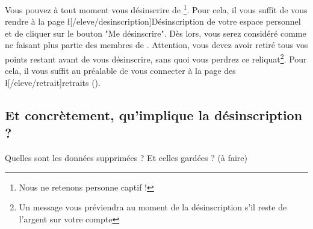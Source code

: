﻿Vous pouvez à tout moment vous désinscrire de \eDevoir\footnote{Nous ne retenons personne captif !}. Pour cela, il vous suffit de vous rendre à la page \l[/eleve/desinscription]{Désinscription} de votre espace personnel et de cliquer sur le bouton "Me désinscrire". Dès lors, vous serez considéré comme ne faisant plus partie des membres de \eDevoir. Attention, vous devez avoir retiré tous vos points restant avant de vous désinscrire, sans quoi vous perdrez ce reliquat\footnote{Un message vous préviendra au moment de la désinscription s'il reste de l'argent sur votre compte \eDevoir}. Pour cela, il vous suffit au préalable de vous connecter à la page des \l[/eleve/retrait]{retraits} ().

\subsection{Et concrètement, qu'implique la désinscription ?}
Quelles sont les données supprimées ? Et celles gardées ? (à faire)